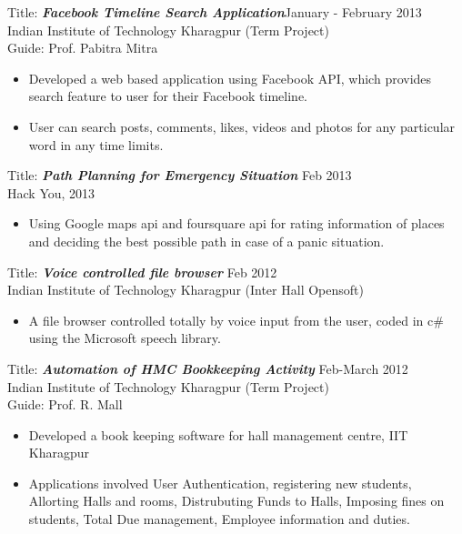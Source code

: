 \documentclass[hidelinks,margin,line,10pt,a4paper]{resume}
\begin{document}
\begin{resume}
Title: \textbf{\emph{Facebook Timeline Search Application}}\hfill January - February 2013 \\
Indian Institute of Technology Kharagpur \hfill  (Term Project) \\
Guide: Prof. Pabitra Mitra
\vspace{2mm}%
\begin{itemize}
\item Developed a web based application using Facebook API, which provides search feature to
user for their Facebook timeline. 
\item User can search posts, comments, likes, videos and photos for any particular word in any time limits.
\end{itemize}

Title: \textbf{\emph{Path Planning for Emergency Situation}} \hfill Feb 2013 \\
Hack You, 2013
\vspace{2mm}%
\begin{itemize}
\item Using Google maps api and foursquare api for rating information of places and deciding the 
best possible path in case of a panic situation. 
\end{itemize}


Title: \textbf{\emph {Voice controlled file browser }} \hfill Feb 2012 \\ Indian Institute of Technology Kharagpur \hfill (Inter Hall Opensoft) 
\vspace{2mm}%
\begin{itemize}
\item A file browser controlled totally by voice input from the user, coded in c\# using the Microsoft speech library. 
\end{itemize}
\iffalse
Title: \textbf{\emph{Automation of HMC Bookkeeping Activity}} \hfill Feb-March 2012 \\
Indian Institute of Technology Kharagpur \hfill (Term Project)  \\
Guide: Prof. R. Mall
\vspace{2mm}%
\begin{itemize}
\item Developed a book keeping software for hall management centre, IIT Kharagpur
\item Applications involved User Authentication, registering new students, Allorting Halls and rooms, Distrubuting Funds to Halls, Imposing fines on students, Total Due management, Employee information and duties.
\end{itemize}



\end{resume}
\end{document}
